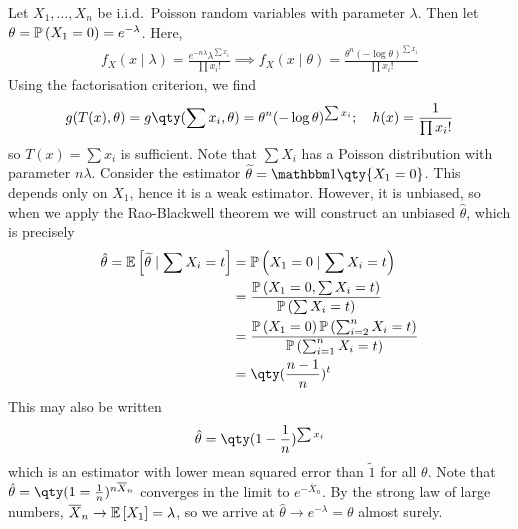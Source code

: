 \begin{example}
	Let $X_1, \dots, X_n$ be i.i.d.\ Poisson random variables with parameter $\lambda$.
	Then let $\theta = \mathbb{P}\left({X_1 = 0}\right) = e^{-\lambda}$.
	Here,
	\begin{align*}
		f_X(x \mid \lambda) = \frac{e^{-n \lambda} \lambda^{\sum x_i}}{\prod x_i!} \implies f_X(x \mid \theta) = \frac{\theta^n (-\log \theta)^{\sum x_i}}{\prod x_i!}
	\end{align*}
	Using the factorisation criterion, we find
	\begin{align*}
		g(T(x), \theta) = g\qty(\sum x_i, \theta) = \theta^n (-\log\theta)^{\sum x_i};\quad h(x) = \frac{1}{\prod x_i!}
	\end{align*}
	so $T(x) = \sum x_i$ is sufficient.
	Note that $\sum X_i$ has a Poisson distribution with parameter $n \lambda$.
	Consider the estimator $\widetilde \theta = \mathbbm 1\qty{X_1 = 0}$.
	This depends only on $X_1$, hence it is a weak estimator.
	However, it is unbiased, so when we apply the Rao-Blackwell theorem we will construct an unbiased $\hat \theta$, which is precisely
	\begin{align*}
		\hat \theta = \expect{\widetilde \theta \mid \sum X_i = t} & = \prob{X_1 = 0 \mid \sum X_i = t} \\
		& = \frac{\prob{X_1 = 0, \sum X_i = t}}{\prob{\sum X_i = t}}                      \\
		& = \frac{\prob{X_1 = 0}\prob{\sum_{i=2}^n X_i = t}}{\prob{\sum_{i=1}^n X_i = t}} \\
		& = \qty(\frac{n-1}{n})^t
\end{align*}
	This may also be written
	\begin{align*}
		\hat \theta = \qty(1 - \frac{1}{n})^{\sum x_i}
	\end{align*}
	which is an estimator with lower mean squared error than $\widetilde 1$ for all $\theta$.
	Note that $\hat \theta = \qty(1 = \frac{1}{n})^{n \overline X_n}$ converges in the limit to $e^{-\overline X_n}$.
	By the strong law of large numbers, $\overline X_n \to \mathbb{E}\left[{X_1}\right] = \lambda$, so we arrive at $\hat \theta \to e^{-\lambda} = \theta$ almost surely.
\end{example}
